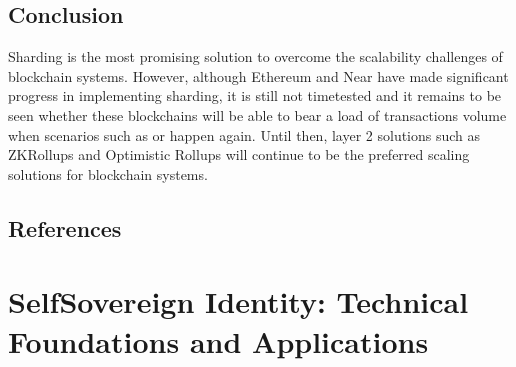 \documentclass[letterpaper,10pt,english]{jupyterBook}
\begin{document}
\subsection{Conclusion}
\label{\detokenize{SHARDING/sharding:conclusion}}
\sphinxAtStartPar
Sharding is the most promising solution to overcome the scalability challenges of blockchain systems. However, although Ethereum and Near have made significant progress in implementing sharding, it is still not time\sphinxhyphen{}tested and it remains to be seen whether these blockchains will be able to bear a load of transactions volume when scenarios such as  or  happen again. Until then, layer 2 solutions such as ZK\sphinxhyphen{}Rollups and Optimistic Rollups will continue to be the preferred scaling solutions for blockchain systems.




\subsection{References}
\label{\detokenize{SHARDING/sharding:references}}
\sphinxstepscope


\section{Self\sphinxhyphen{}Sovereign Identity: Technical Foundations and Applications}
\label{\detokenize{SSI/ssi:self-sovereign-identity-technical-foundations-and-applications}}\label{\detokenize{SSI/ssi::doc}}
\sphinxAtStartPar
{}
\end{document}
